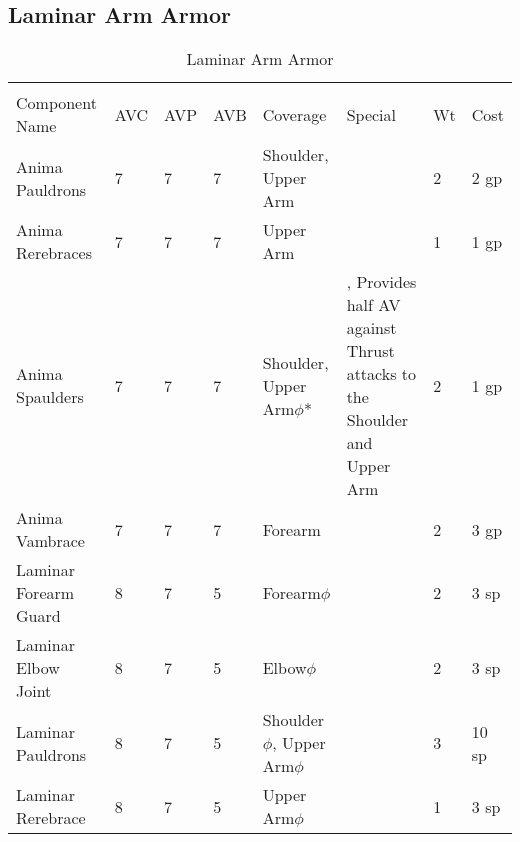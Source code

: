 \documentclass[oneside,11pt,english]{book}
\begin{document}
\subsection{Laminar Arm Armor}
\begin{longtabu} to 
  \captionsetup{textformat=empty, labelformat=blank}
  \caption{Laminar Arm Armor} \vspace{-15pt}
  \label{tab:Laminar Arm Armor}\\
  Component Name&AVC&AVP&AVB& Coverage& Special& Wt&Cost\\\toprule
  Anima Pauldrons& 7& 7& 7& Shoulder, Upper Arm& & 2& 2 gp\\
  Anima Rerebraces& 7& 7& 7& Upper Arm& & 1& 1 gp\\
  Anima Spaulders& 7& 7& 7& Shoulder, Upper Arm\hyperref[sec:Weak Spots]{$\phi$}*& , Provides half AV against 
  Thrust attacks to the Shoulder and Upper Arm& 2& 1 gp\\
  Anima Vambrace& 7& 7& 7& Forearm& & 2& 3 gp\\
  Laminar Forearm  Guard& 8& 7& 5& Forearm\hyperref[sec:Weak Spots]{$\phi$}& & 2& 3 sp\\
  Laminar Elbow Joint& 8& 7& 5& Elbow\hyperref[sec:Weak Spots]{$\phi$}& & 2& 3 sp\\
  Laminar Pauldrons& 8& 7& 5& Shoulder\hyperref[sec:Weak Spots]{$\phi$}, Upper Arm\hyperref[sec:Weak Spots]{$\phi$}& & 3& 10 sp\\
  Laminar Rerebrace& 8& 7& 5& Upper Arm\hyperref[sec:Weak Spots]{$\phi$}& & 1& 3 sp\\
\end{longtabu}
\end{document}
